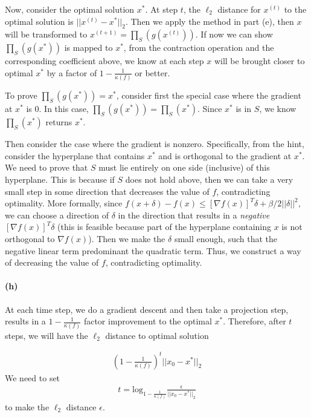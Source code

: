 \documentclass[12pt]{article}
\begin{document}
Now, consider the optimal solution $x^*$. At step $t$, the $\ell_2$ distance for $x^{(t)}$ to the optimal solution is $||x^{(t)} - x^*||_2$. Then we apply the method in part (e), then $x$ will be transformed to $x^{(t+1)}=\prod_S(g(x^{(t)}))$. If now we can show $\prod_S(g(x^*))$ is mapped to $x^*$, from the contraction operation and the corresponding coefficient above, we know at each step $x$ will be brought closer to optimal $x^*$ by a factor of $1-\frac{1}{\kappa(f)}$ or better.

To prove $\prod_S(g(x^*)) = x^*$, consider first the special case where the gradient at $x^*$ is $0$. In this case, $\prod_S(g(x^*)) = \prod_S(x^*)$. Since $x^*$ is in $S$, we know $\prod_S(x^*)$ returns $x^*$. 

Then consider the case where the gradient is nonzero. Specifically, from the hint, consider the hyperplane that contains $x^*$ and is orthogonal to the gradient at $x^*$. We need to prove that $S$ must lie entirely on one side (inclusive) of this hyperplane. This is because if $S$ does not hold above, then we can take a very small step in some direction that decreases the value of $f$, contradicting optimality. More formally,  since $f(x + \delta) - f(x) \leq [\nabla f(x)]^T \delta  +  \beta/2 ||\delta||^2$, we can choose a direction of $\delta$ in the direction that results in a \emph{negative} $[\nabla f(x)]^T \delta$ (this is feasible because part of the hyperplane containing $x$ is not orthogonal to $\nabla f(x)$). Then we make the $\delta$ small enough, such that the negative linear term predominant the quadratic term. Thus, we construct a way of decreasing the value of $f$, contradicting optimality.

\paragraph{(h)} At each time step, we do a gradient descent and then take a projection step, results in a $1-\frac{1}{\kappa(f)}$ factor improvement to the optimal $x^*$. Therefore, after $t$ steps, we will have the $\ell_2$ distance to optimal solution 

\begin{align*}
\left(1-\frac{1}{\kappa(f)}\right)^t||x_0 - x^*||_2
\end{align*}
We need to set 
\begin{align*}
t = \text{log}_{1-\frac{1}{\kappa(f)}}\frac{\epsilon}{ ||x_0 - x^*||_2}
\end{align*}
to make the $\ell_2$ distance $\epsilon$.
\end{document}
